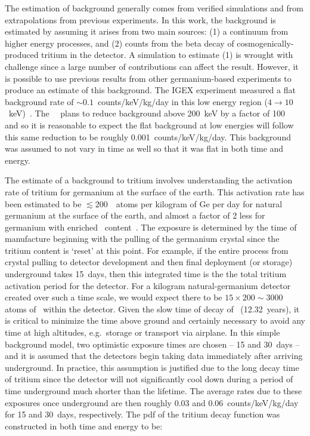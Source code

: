 The estimation of background generally comes from verified simulations and from extrapolations from previous experiments.  In this work, the background is estimated by assuming it arises from two main sources: (1) a continuum from higher energy processes, and (2) counts from the beta decay of cosmogenically-produced tritium in the detector.  A simulation to estimate (1) is wrought with challenge since a large number of contributions can affect the result.  However, it is possible to use previous results from other germanium-based experiments to produce an estimate of this background.  The IGEX experiment measured a flat background rate of $\sim0.1$~counts/keV/kg/day in this low energy region ($4\to10$~keV)~\cite{Ira01}.    The \MJ~\minmod~plans to reduce background above 200~keV by a factor of 100~\cite{MajoranaWhitePaper} and so it is reasonable to expect the flat background at low energies will follow this same reduction to be roughly 0.001~counts/keV/kg/day.  This background was assumed to not vary in time as well so that it was flat in both time and energy.

The estimate of a background to tritium involves understanding the activation rate of tritium for germanium at the surface of the earth.  This activation rate has been estimated to be $\lesssim200$~\hthree~atoms per kilogram of Ge per day for natural germanium at the surface of the earth, and almost a factor of 2 less for germanium with enriched \gersevensix~content~\cite{Avi92}.  The exposure is determined by the time of manufacture beginning with the pulling of the germanium crystal since the tritium content is `reset' at this point.  For example, if the entire process from crystal pulling to detector development and then final deployment (or storage) underground takes 15~days, then this integrated time is the the total tritium activation period for the detector.  For a kilogram natural-germanium detector created over such a time scale, we would expect there to be $15\times200\sim3000$ atoms of \hthree~within the detector.  Given the slow time of decay of \hthree~(12.32~years), it is critical to minimize the time above ground and certainly necessary to avoid any time at high altitudes, e.g.~storage or transport via airplane.  In this simple background model, two optimistic exposure times are chosen -- 15 and 30~days -- and it is assumed that the detectors begin taking data immediately after arriving underground.  In practice, this assumption is justified due to the long decay time of tritium since the detector will not significantly cool down during a period of time underground much shorter than the lifetime.  The average rates due to these exposures once underground are then roughly 0.03 and 0.06~counts/keV/kg/day for 15 and 30~days, respectively.  The pdf of the tritium decay function was constructed in both time and energy to be:

